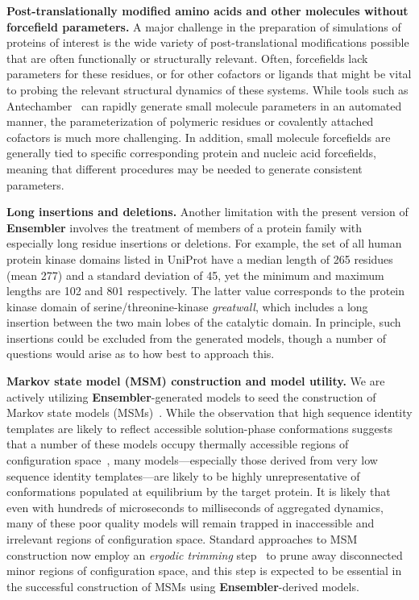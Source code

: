 \documentclass[aps,pre,twocolumn,nofootinbib,superscriptaddress,linenumbers]{revtex4-1}
\begin{document}
{\bf Post-translationally modified amino acids and other molecules without forcefield parameters.}
A major challenge in the preparation of simulations of proteins of interest is the wide variety of post-translational modifications possible that are often functionally or structurally relevant.
Often, forcefields lack parameters for these residues, or for other cofactors or ligands that might be vital to probing the relevant structural dynamics of these systems.
While tools such as Antechamber~\cite{gaff,gaff2} can rapidly generate small molecule parameters in an automated manner, the parameterization of polymeric residues or covalently attached cofactors is much more challenging.
In addition, small molecule forcefields are generally tied to specific corresponding protein and nucleic acid forcefields, meaning that different procedures may be needed to generate consistent parameters.

{\bf Long insertions and deletions.}
Another limitation with the present version of {\bf Ensembler} involves the treatment of members of a protein family with especially long residue insertions or deletions.
For example, the set of all human protein kinase domains listed in UniProt have a median length of 265 residues (mean 277) and a standard deviation of 45, yet the minimum and maximum lengths are 102 and 801 respectively.
The latter value corresponds to the protein kinase domain of serine/threonine-kinase \emph{greatwall}, which includes a long insertion between the two main lobes of the catalytic domain.
In principle, such insertions could be excluded from the generated models, though a number of questions would arise as to how best to approach this.

{\bf Markov state model (MSM) construction and model utility.}
We are actively utilizing {\bf Ensembler}-generated models to seed the construction of Markov state models (MSMs)~\cite{pande-beauchamp-bowman:2010:methods:markov-model-review,chodera-noe:curr-opin-struct-biol:2014:msm-review}.
While the observation that high sequence identity templates are likely to reflect accessible solution-phase conformations suggests that a number of these models occupy thermally accessible regions of configuration space~\cite{friedland:plos-comput-biol:2009:conformational-dynamics}, many models---especially those derived from very low sequence identity templates---are likely to be highly unrepresentative of conformations populated at equilibrium by the target protein.
It is likely that even with hundreds of microseconds to milliseconds of aggregated dynamics, many of these poor quality models will remain trapped in inaccessible and irrelevant regions of configuration space.
Standard approaches to MSM construction now employ an \emph{ergodic trimming} step~\cite{caflisch:jpcb:2011:msm-subgraph,msmbuilder} to prune away disconnected minor regions of configuration space, and this step is expected to be essential in the successful construction of MSMs using {\bf Ensembler}-derived models.
\end{document}
